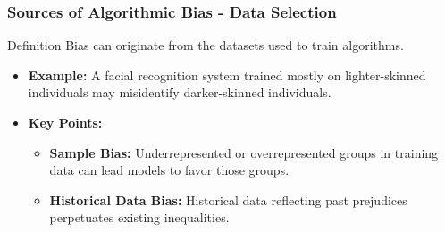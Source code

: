 \documentclass{beamer}
\begin{document}
\begin{frame}[fragile]
    \frametitle{Sources of Algorithmic Bias - Data Selection}
    \begin{block}{Definition}
    Bias can originate from the datasets used to train algorithms.
    \end{block}
    \begin{itemize}
        \item \textbf{Example:} A facial recognition system trained mostly on lighter-skinned individuals may misidentify darker-skinned individuals.
        \item \textbf{Key Points:}
        \begin{itemize}
            \item \textbf{Sample Bias:} Underrepresented or overrepresented groups in training data can lead models to favor those groups.
            \item \textbf{Historical Data Bias:} Historical data reflecting past prejudices perpetuates existing inequalities.
        \end{itemize}
    \end{itemize}
\end{frame}
\end{document}

